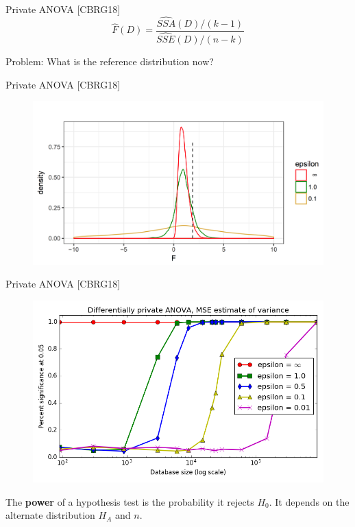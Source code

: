 \documentclass{beamer}
\newcommand{\sse}{\textit{SSE}\xspace}
\newcommand{\ssa}{\textit{SSA}\xspace}
\begin{document}
\begin{frame}{Private ANOVA [CBRG18]}
$$\widehat{F}(D) = \frac{\widehat{\ssa}(D)/(k-1)}{\widehat{\sse}(D)/(n-k)}$$
\bigskip

 \pause
 \centering
Problem: What is the reference distribution now?
\end{frame}


\begin{frame}{Private ANOVA [CBRG18]}
\begin{figure}
  \includegraphics[scale=0.35]{images/noisy-ref-dist}
\end{figure} 
\end{frame}


\begin{frame}{Private ANOVA [CBRG18]}
  \begin{figure}
  \includegraphics[scale=0.45]{images/campbellpower}
  \end{figure}
  \begin{definition}[Power]
The \textbf{power} of a hypothesis test is the probability it rejects $H_0$.  It depends on the alternate distribution $H_A$ and $n$.
\end{definition}
\end{frame}
\end{document}
